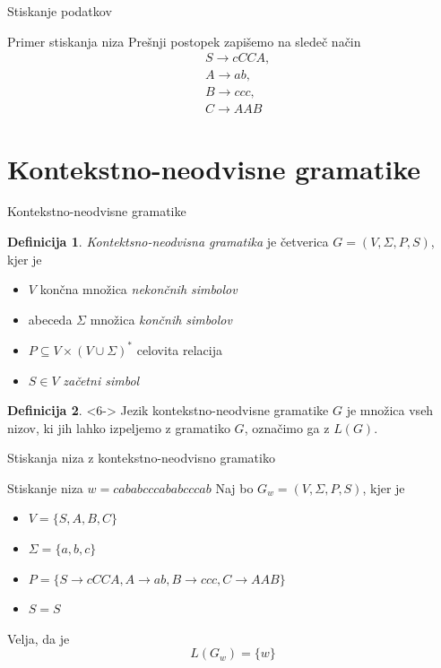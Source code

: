 \documentclass{beamer}
\theoremstyle{definition} %
\newtheorem{definicija}{Definicija}[section]
\begin{document}
\begin{frame}{Stiskanje podatkov}
    \begin{exampleblock}{Primer stiskanja niza}
        Prešnji postopek zapišemo na sledeč način
        \begin{align*}
            & S  \rightarrow  \mathit{cCCA}, \\
            & A  \rightarrow  \mathit{ab}, \\
            & B  \rightarrow  \mathit{ccc}, \\
            & C  \rightarrow  \mathit{AAB}
        \end{align*}
    \end{exampleblock}
\end{frame}

\section*{Kontekstno-neodvisne gramatike}

\begin{frame}{Kontekstno-neodvisne gramatike}
    \begin{definicija}
        \textit{Kontektsno-neodvisna gramatika} je četverica $ G = ( V, \Sigma, P, S ) $, kjer je
        \begin{itemize}
            \item<2-> $ V $ končna množica \textit{nekončnih simbolov}
            \item<3-> abeceda $ \Sigma $ množica \textit{končnih simbolov}
            \item<4-> $ P \subseteq V \times ( V \cup \Sigma )^* $ celovita relacija
            \item<5-> $ S \in V $ \textit{začetni simbol}
        \end{itemize}
    \end{definicija}
    \begin{definicija}<6->
        Jezik kontekstno-neodvisne gramatike $ G $ je množica vseh nizov, ki jih lahko izpeljemo
        z gramatiko $ G $, označimo ga z $ L(G) $.
    \end{definicija}
\end{frame}

\begin{frame}{Stiskanja niza z kontekstno-neodvisno gramatiko}
    \begin{exampleblock}{Stiskanje niza $ w = \mathit{cababcccababcccab} $}
        Naj bo $ G_w = ( V, \Sigma, P, S ) $, kjer je 
        \begin{itemize}
            \item<2-> $ V = \{ S, A, B, C \} $
            \item<3-> $ \Sigma = \{ a, b, c \} $
            \item<4-> $ P = \{ S  \rightarrow  \mathit{cCCA}, A  \rightarrow  \mathit{ab}, B  
            \rightarrow  \mathit{ccc}, C  \rightarrow  \mathit{AAB} \} $
            \item<5-> $ S = S $
        \end{itemize}
        \pause
        Velja, da je 
        \[
            L(G_w) = \{ w \}
        \]
    \end{exampleblock}
\end{frame}
\end{document}
